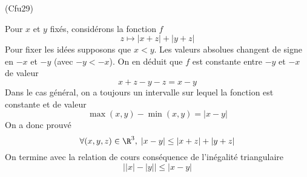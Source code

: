 \begin{tiny}(Cfu29)\end{tiny} Pour $x$ et $y$ fixés, considérons la fonction $f$
\begin{displaymath}
  z \mapsto |x+z| + |y+z|
\end{displaymath}
Pour fixer les idées supposons que $x < y$. Les valeurs absolues changent de signe en $-x$ et $-y$ (avec $-y < -x$). On en déduit que $f$ est constante entre $-y$ et $-x$ de valeur 
\begin{displaymath}
  x + z - y - z = x-y
\end{displaymath}
Dans le cas général, on a toujours un intervalle sur lequel la fonction est constante et de valeur
\begin{displaymath}
  \max(x,y) - \min(x,y) = |x-y|
\end{displaymath}
On a donc prouvé 
\begin{displaymath}
\forall (x,y,z)\in \R^3, \; |x-y| \leq | x+ z| + |y+z|
\end{displaymath}
On termine avec la relation de cours conséquence de l'inégalité triangulaire
\begin{displaymath}
\left| |x| - |y| \right| \leq |x-y|
\end{displaymath}
